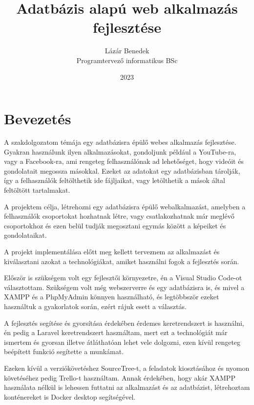 \documentclass[
]{thesis-ekf}
\theoremstyle{definition}
\theoremstyle{remark}
\begin{document}
\title{Adatbázis alapú web alkalmazás fejlesztése}
\author{Lázár Benedek\\Programtervező informatikus BSc}
\date{2023}
\maketitle
\tableofcontents

\chapter*{Bevezetés}

A szakdolgozatom témája egy adatbázisra épülő webes alkalmazás fejlesztése. Gyakran használunk ilyen alkalmazásokat, gondoljunk például a YouTube-ra, vagy a Facebook-ra, ami rengeteg felhasználónak ad lehetőséget, hogy videóit és gondolatait megossza másokkal. Ezeket az adatokat egy adatbázisban tárolják, így a felhasználók feltölthetik ide fájljaikat, vagy letölthetik a mások által feltöltött tartalmakat.

A projektem célja, létrehozni egy adatbázisra épülő webalkalmazást, amelyben a felhasználók csoportokat hozhatnak létre, vagy csatlakozhatnak már meglévő csoportokhoz és ezen belül tudják megosztani egymás között a képeiket és gondolataikat.

A projekt implementálása előtt meg kellett terveznem az alkalmazást és kiválasztani azokat a technológiákat, amiket használni fogok a fejlesztés során.

\vspace{5mm}

Először is szükségem volt egy fejlesztői környezetre, én a Visual Studio Code-ot választottam. Szükségem volt még webszerverre és egy adatbázisra is, és mivel a XAMPP és a PhpMyAdmin könnyen használható, és legtöbbször ezeket használtuk a gyakorlatok során, ezért rájuk esett a választás.

A fejlesztés segítése és gyorsítása érdekében érdemes keretrendszert is használni, én pedig a Laravel keretrendszert használtam, mert ezt a technológiát már ismertem és gyorsan illetve átláthatóan lehet vele dolgozni, ezen kívül rengeteg beépített funkció segítette a munkámat.

Ezeken kívül a verziókövetéshez SourceTree-t, a feladatok kiosztásához és nyomon követéséhez pedig Trello-t használtam.
Annak érdekében, hogy akár XAMPP használata nélkül is lehessen futtatni az alkalmazást és az adatbázist, létrehoztam konténereket is Docker desktop segítségével.
\end{document}
